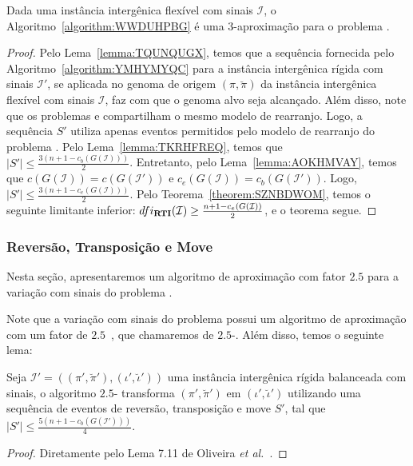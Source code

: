 \begin{theorem}\label{theorem:IRGQGPKZ}
Dada uma instância intergênica flexível com sinais $\mathcal{I}$, o Algoritmo~\ref{algorithm:WWDUHPBG} é uma $3$-aproximação para o problema \SbFIRTI{}.
\end{theorem}
\begin{proof}
Pelo Lema~\ref{lemma:TQUNQUGX}, temos que a sequência fornecida pelo Algoritmo~\ref{algorithm:YMHYMYQC} para a instância intergênica rígida com sinais $\mathcal{I'}$, se aplicada no genoma de origem $(\pi,\breve\pi)$ da instância intergênica flexível com sinais $\mathcal{I}$, faz com que o genoma alvo seja alcançado. Além disso, note que os problemas \SbIRTI{} e \SbFIRTI{} compartilham o mesmo modelo de rearranjo. Logo, a sequência $S'$ utiliza apenas eventos permitidos pelo modelo de rearranjo do problema \SbFIRTI{}. Pelo Lema~\ref{lemma:TKRHFREQ}, temos que $|S'| \le \frac{3(n+1 - c_b(G(\mathcal{I})))}{2}$. Entretanto, pelo Lema~\ref{lemma:AOKHMVAY}, temos que $c(G(\mathcal{I})) = c(G(\mathcal{I}'))$ e $c_e(G(\mathcal{I})) = c_b(G(\mathcal{I}'))$. Logo, $|S'| \le \frac{3(n+1 - c_e(G(\mathcal{I})))}{2}$. Pelo Teorema~\ref{theorem:SZNBDWOM}, temos o seguinte limitante inferior: $dfi_{\textbf{RTI}}(\mathcal{I}) \ge \frac{n+1 - c_e(G(\mathcal{I}))}{2}$, e o teorema segue.
\end{proof}

\subsubsection{Reversão, Transposição e Move}

Nesta seção, apresentaremos um algoritmo de aproximação com fator $2.5$ para a variação com sinais do problema \SbFIRTM{}. 

Note que a variação com sinais do problema \SbIRTM{} possui um algoritmo de aproximação com um fator de $2.5$~\cite{2021a-oliveira-etal}, que chamaremos de $2.5$-\SbIRTM{}. Além disso, temos o seguinte lema:

\begin{lemma}\label{lemma:TPROVWMO}
Seja $\mathcal{I}' = ((\pi',\breve\pi'),(\iota',\breve\iota'))$ uma instância intergênica rígida balanceada com sinais, o algoritmo $2.5$-\SbIRTM{} transforma $(\pi',\breve\pi')$ em $(\iota',\breve\iota')$ utilizando uma sequência de eventos de reversão, transposição e move $S'$, tal que $|S'| \le \frac{5({n+1} - c_b(G(\mathcal{I}')))}{4}$.
\end{lemma}
\begin{proof}
Diretamente pelo Lema 7.11 de Oliveira \textit{et al.}~\cite{2021a-oliveira-etal}.
\end{proof}

